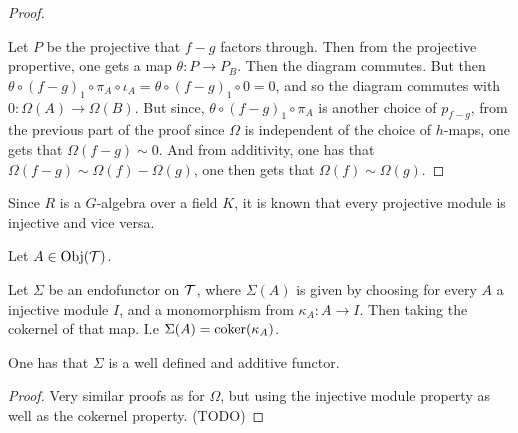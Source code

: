 \begin{proof}
\begin{center}
    \end{center}

    Let \( P \) be the projective that \( f - g \) factors through. Then from the projective propertive, one gets a map \( \theta: P \to P_B \). Then the diagram commutes. But then \( \theta \circ (f-g)_1 \circ \pi_A \circ \iota_A = \theta \circ (f-g)_1 \circ 0 = 0 \), and so the diagram commutes with \( 0: \Omega(A) \to \Omega(B) \). But since, \( \theta \circ (f-g)_1 \circ \pi_A \) is another choice of \( p_{f - g} \), from the previous part of the proof since \( \Omega \) is independent of the choice of \( h \)-maps, one gets that \( \Omega(f - g) \sim 0 \). And from additivity, one has that \( \Omega(f - g) \sim \Omega(f) - \Omega(g) \), one then gets that \( \Omega(f) \sim \Omega(g) \).
\end{proof}

\begin{remark}
    Since \( R \) is a \( G \)-algebra over a field \( K \), it is known that every projective module is injective and vice versa.
\end{remark}

\begin{definition}
    Let \( A \in \operatorname{Obj}({\mathcal{T}}) \).

    Let \( \Sigma \) be an endofunctor on \( {\mathcal{T}} \), where \( \Sigma(A) \) is given by choosing for every \( A \) a injective module \( I \), and a monomorphism from \( \kappa_A: A \to I \). Then taking the cokernel of that map. I.e \( \Sigma(A) = \operatorname{coker}(\kappa_A) \).
\end{definition}

\begin{lemma}
    One has that \( \Sigma \) is a well defined and additive functor.
\end{lemma}
\begin{proof}
    Very similar proofs as for \( \Omega \), but using the injective module property as well as the cokernel property. (TODO)
\end{proof}


